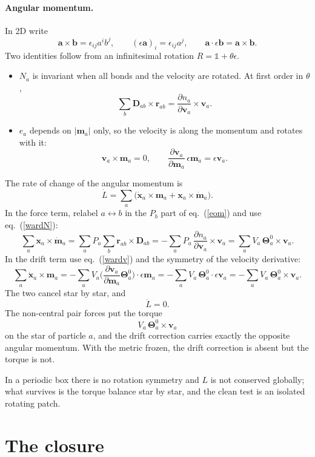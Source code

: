 \documentclass[11pt,aps,preprint,nofootinbib,superscriptaddress,tightenlines]{revtex4-2}
\def\st{\begin{equation}}
\def\stp{\end{equation}}
\def\Eq#1{eq.~(\ref{#1})}
\newcommand{\one}{\mathds{1}}
\let\oldparagraph\paragraph
\renewcommand{\paragraph}{\par\bigskip\oldparagraph}
\begin{document}
\paragraph{Angular momentum.}  In 2D write
\st
\bm a\times\bm b=\epsilon_{ij}a^ib^j,\qquad (\epsilon\bm a)_i=\epsilon_{ij}a^j,\qquad \bm a\cdot\epsilon\bm b=\bm a\times\bm b .
\stp
Two identities follow from an infinitesimal rotation $R=\one+\theta\epsilon$.
\begin{itemize}
\item $N_a$ is invariant when all bonds and the velocity are rotated.  At first order in $\theta$,
  \st
  \sum_b\bm D_{ab}\times\bm r_{ab}=\frac{\partial n_a}{\partial\bm v_a}\times\bm v_a .
  \label{wardN}
  \stp
\item $e_a$ depends on $|\bm m_a|$ only, so the velocity is along the momentum and rotates with it:
  \st
  \bm v_a\times\bm m_a=0,\qquad \frac{\partial\bm v_a}{\partial\bm m_a}\,\epsilon\bm m_a=\epsilon\bm v_a .
  \label{wardv}
  \stp
\end{itemize}
The rate of change of the angular momentum is
\st
\dot L=\sum_a\big(\dot{\bm x}_a\times\bm m_a+\bm x_a\times\dot{\bm m}_a\big) .
\stp
In the force term, relabel $a\leftrightarrow b$ in the $P_b$ part of \Eq{eom} and use \Eq{wardN}:
\st
\sum_a\bm x_a\times\dot{\bm m}_a=\sum_aP_a\sum_b\bm r_{ab}\times\bm D_{ab}
=-\sum_aP_a\,\frac{\partial n_a}{\partial\bm v_a}\times\bm v_a
=\sum_aV_a\,\bm\Theta^0_a\times\bm v_a .
\stp
In the drift term use \Eq{wardv} and the symmetry of the velocity derivative:
\st
\sum_a\dot{\bm x}_a\times\bm m_a=-\sum_aV_a\Big(\frac{\partial\bm v_a}{\partial\bm m_a}\bm\Theta^0_a\Big)\cdot\epsilon\bm m_a
=-\sum_aV_a\,\bm\Theta^0_a\cdot\epsilon\bm v_a
=-\sum_aV_a\,\bm\Theta^0_a\times\bm v_a .
\stp
The two cancel star by star, and
\st
\dot L=0 .
\stp
The non-central pair forces put the torque
\st
V_a\,\bm\Theta^0_a\times\bm v_a
\stp
on the star of particle $a$, and the drift correction carries exactly the opposite angular momentum.  With the metric frozen, the
drift correction is absent but the torque is not.

In a periodic box there is no rotation symmetry and $L$ is not conserved globally; what survives is the torque balance star by star,
and the clean test is an isolated rotating patch.

\section{The closure}
\label{sec:closure}
\end{document}
